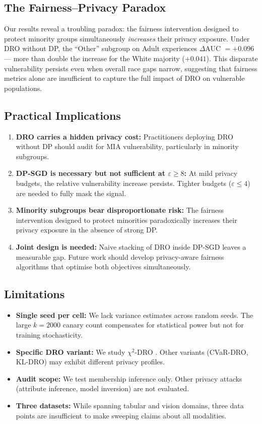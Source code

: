 \documentclass[11pt, a4paper]{article}
\begin{document}
\subsection{The Fairness--Privacy Paradox}

Our results reveal a troubling paradox: the fairness intervention designed to protect minority groups simultaneously \textit{increases} their privacy exposure. Under DRO without DP, the ``Other'' subgroup on Adult experiences $\Delta$AUC $= +0.096$ --- more than double the increase for the White majority ($+0.041$). This disparate vulnerability persists even when overall race gaps narrow, suggesting that fairness metrics alone are insufficient to capture the full impact of DRO on vulnerable populations.

\subsection{Practical Implications}

\begin{enumerate}
    \item \textbf{DRO carries a hidden privacy cost:} Practitioners deploying DRO without DP should audit for MIA vulnerability, particularly in minority subgroups.
    \item \textbf{DP-SGD is necessary but not sufficient at $\varepsilon \ge 8$:} At mild privacy budgets, the relative vulnerability increase persists. Tighter budgets ($\varepsilon \le 4$) are needed to fully mask the signal.
    \item \textbf{Minority subgroups bear disproportionate risk:} The fairness intervention designed to protect minorities paradoxically increases their privacy exposure in the absence of strong DP.
    \item \textbf{Joint design is needed:} Naive stacking of DRO inside DP-SGD leaves a measurable gap. Future work should develop privacy-aware fairness algorithms that optimise both objectives simultaneously.
\end{enumerate}

\subsection{Limitations}

\begin{itemize}
    \item \textbf{Single seed per cell:} We lack variance estimates across random seeds. The large $k=2000$ canary count compensates for statistical power but not for training stochasticity.
    \item \textbf{Specific DRO variant:} We study $\chi^2$-DRO \cite{hashimoto2018}. Other variants (CVaR-DRO, KL-DRO) may exhibit different privacy profiles.
    \item \textbf{Audit scope:} We test membership inference only. Other privacy attacks (attribute inference, model inversion) are not evaluated.
    \item \textbf{Three datasets:} While spanning tabular and vision domains, three data points are insufficient to make sweeping claims about all modalities.
\end{itemize}
\end{document}
